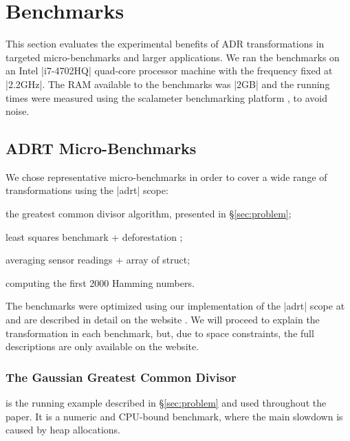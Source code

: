 \section{Benchmarks}
\label{sec:benchmarks}
\label{sec:benchmarks:ad-hoc}

This section evaluates the experimental benefits of ADR transformations in targeted micro-benchmarks and larger
applications.
%
%
We ran the benchmarks on an Intel |i7-4702HQ| quad-core processor machine with the frequency fixed at |2.2GHz|. The RAM available to the benchmarks was |2GB| and the running times were measured using the scalameter benchmarking platform \cite{scalameter}, to avoid noise.


\subsection{ADRT Micro-Benchmarks}

We chose representative micro-benchmarks in order to cover a wide range of transformations using the |adrt| scope:

\begin{compactitem}
\item the greatest common divisor algorithm, presented in \S\ref{sec:problem};
\item least squares benchmark + deforestation \cite{wadler-deforestation};
\item averaging sensor readings + array of struct;
\item computing the first 2000 Hamming numbers.
\end{compactitem}

\noindent
The benchmarks were optimized using our implementation of the |adrt| scope at \cite{ildl-plugin} and are described in detail on the website \cite{ildl-plugin-wiki}. We will proceed to explain the transformation in each benchmark, but, due to space constraints, the full descriptions are only available on the website.

\subsubsection{The Gaussian Greatest Common Divisor}
is the running example described in \S\ref{sec:problem} and used throughout the paper. It is a numeric and CPU-bound benchmark, where the main slowdown is caused by heap allocations.


